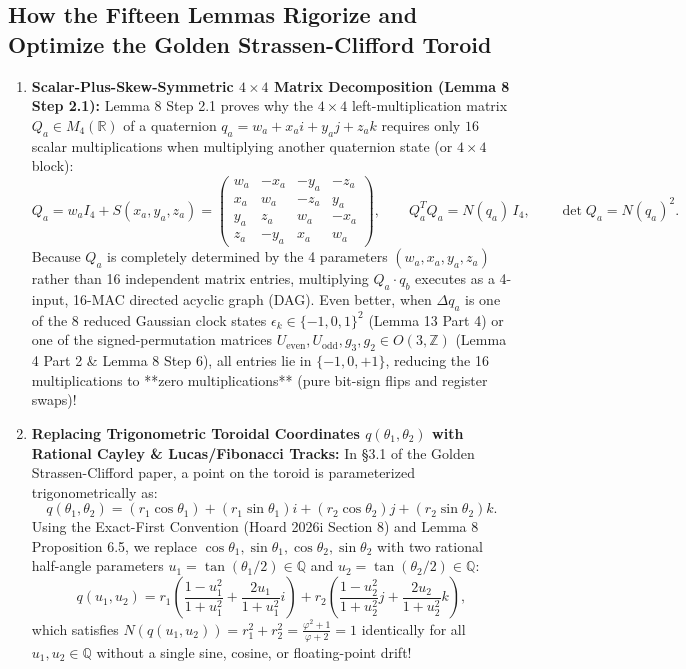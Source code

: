 \documentclass[11pt, a4paper]{article}
\begin{document}
\subsection{How the Fifteen Lemmas Rigorize and Optimize the Golden Strassen-Clifford Toroid}
\begin{enumerate}
    \item \textbf{Scalar-Plus-Skew-Symmetric $4\times 4$ Matrix Decomposition (Lemma 8 Step 2.1):}
    Lemma 8 Step 2.1 proves why the $4\times 4$ left-multiplication matrix $Q_a \in M_4(\mathbb{R})$ of a quaternion $q_a = w_a + x_a i + y_a j + z_a k$ requires only $16$ scalar multiplications when multiplying another quaternion state (or $4\times 4$ block):
    \begin{equation}
    Q_a = w_a I_4 + S(x_a, y_a, z_a) = \begin{pmatrix}
    w_a & -x_a & -y_a & -z_a \\
    x_a &  w_a & -z_a &  y_a \\
    y_a &  z_a &  w_a & -x_a \\
    z_a & -y_a &  x_a &  w_a
    \end{pmatrix}, \qquad Q_a^T Q_a = N(q_a)\,I_4, \qquad \det Q_a = N(q_a)^2.
    \end{equation}
    Because $Q_a$ is completely determined by the 4 parameters $(w_a, x_a, y_a, z_a)$ rather than 16 independent matrix entries, multiplying $Q_a \cdot q_b$ executes as a 4-input, 16-MAC directed acyclic graph (DAG). Even better, when $\Delta q_a$ is one of the 8 reduced Gaussian clock states $\epsilon_k \in \{-1, 0, 1\}^2$ (Lemma 13 Part 4) or one of the signed-permutation matrices $U_{\text{even}}, U_{\text{odd}}, g_3, g_2 \in O(3,\mathbb{Z})$ (Lemma 4 Part 2 \& Lemma 8 Step 6), all entries lie in $\{-1, 0, +1\}$, reducing the 16 multiplications to **zero multiplications** (pure bit-sign flips and register swaps)!
    \item \textbf{Replacing Trigonometric Toroidal Coordinates $q(\theta_1, \theta_2)$ with Rational Cayley \& Lucas/Fibonacci Tracks:}
    In §3.1 of the Golden Strassen-Clifford paper, a point on the toroid is parameterized trigonometrically as:
    \begin{equation}
    q(\theta_1, \theta_2) = (r_1\cos\theta_1) + (r_1\sin\theta_1)i + (r_2\cos\theta_2)j + (r_2\sin\theta_2)k.
    \end{equation}
    Using the Exact-First Convention (Hoard 2026i Section 8) and Lemma 8 Proposition 6.5, we replace $\cos\theta_1, \sin\theta_1, \cos\theta_2, \sin\theta_2$ with two rational half-angle parameters $u_1 = \tan(\theta_1/2) \in \mathbb{Q}$ and $u_2 = \tan(\theta_2/2) \in \mathbb{Q}$:
    \begin{equation}
    q(u_1, u_2) = r_1\left(\frac{1-u_1^2}{1+u_1^2} + \frac{2u_1}{1+u_1^2}i\right) + r_2\left(\frac{1-u_2^2}{1+u_2^2}j + \frac{2u_2}{1+u_2^2}k\right),
    \end{equation}
    which satisfies $N(q(u_1, u_2)) = r_1^2 + r_2^2 = \frac{\varphi^2 + 1}{\varphi + 2} = 1$ identically for all $u_1, u_2 \in \mathbb{Q}$ without a single sine, cosine, or floating-point drift!
\end{enumerate}
\end{document}
